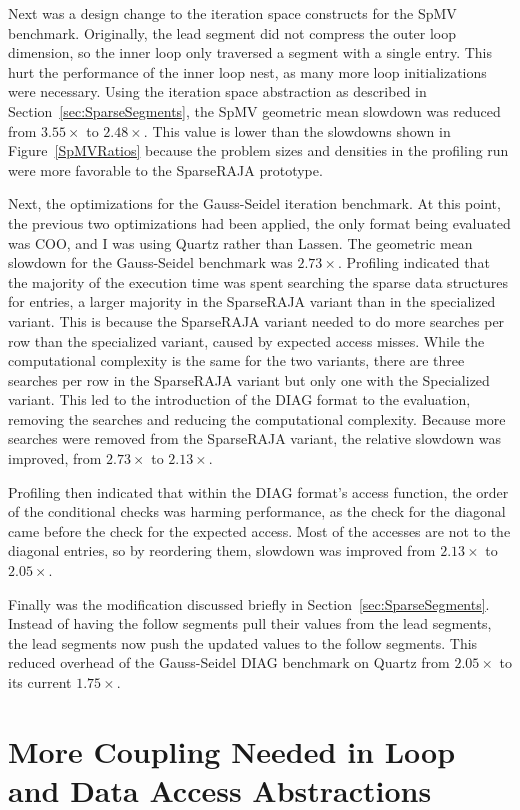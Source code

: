 Next was a design change to the iteration space constructs for the SpMV benchmark.
Originally, the lead segment did not compress the outer loop dimension, so the inner loop only traversed a segment with a single entry.
This hurt the performance of the inner loop nest, as many more loop initializations were necessary.
Using the iteration space abstraction as described in Section~\ref{sec:SparseSegments}, the SpMV geometric mean slowdown was reduced from $3.55\times$ to $2.48\times$.
This value is lower than the slowdowns shown in Figure~\ref{SpMVRatios} because the problem sizes and densities in the profiling run were more favorable to the SparseRAJA prototype.

Next, the optimizations for the Gauss-Seidel iteration benchmark.
At this point, the previous two optimizations had been applied, the only format being evaluated was COO\@, and I was using Quartz rather than Lassen.
The geometric mean slowdown for the Gauss-Seidel benchmark was $2.73\times$.
Profiling indicated that the majority of the execution time was spent searching the sparse data structures for entries, a larger majority in the SparseRAJA variant than in the specialized variant.
This is because the SparseRAJA variant needed to do more searches per row than the specialized variant, caused by expected access misses.
While the computational complexity is the same for the two variants, there are three searches per row in the SparseRAJA variant but only one with the Specialized variant.
This led to the introduction of the DIAG format to the evaluation, removing the searches and reducing the computational complexity. 
Because more searches were removed from the SparseRAJA variant, the relative slowdown was improved, from $2.73\times$ to $2.13\times$.

Profiling then indicated that within the DIAG format's access function, the order of the conditional checks was harming performance, as the check for the diagonal came before the check for the expected access.
Most of the accesses are not to the diagonal entries, so by reordering them, slowdown was improved from $2.13\times$ to $2.05\times$.

Finally was the modification discussed briefly in Section~\ref{sec:SparseSegments}.
Instead of having the follow segments pull their values from the lead segments, the lead segments now push the updated values to the follow segments.
This reduced overhead of the Gauss-Seidel DIAG benchmark on Quartz from $2.05\times$ to its current $1.75\times$.

\section{More Coupling Needed in Loop and Data Access Abstractions}\label{sec:SparseDiscussion}

